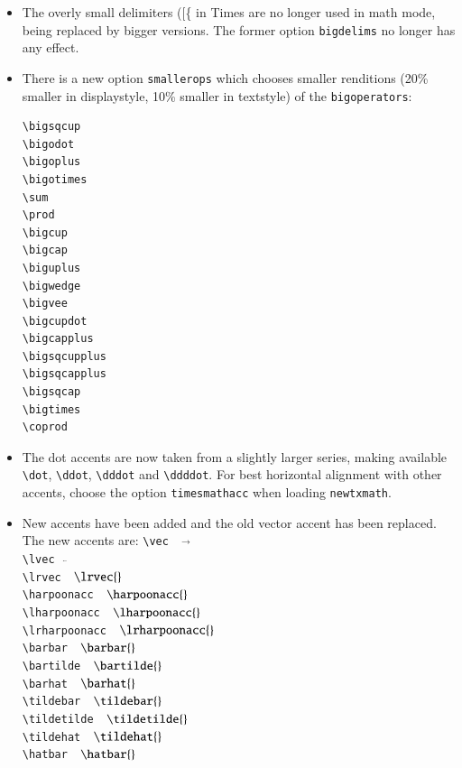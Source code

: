\documentclass[11pt]{article}
\theoremstyle{oldplain}
\theoremstyle{plain}
\begin{document}
\begin{itemize}
\begin{center}
\begin{tabular}{@{} llll @{}}
$\smallvarointclockwise$  & \verb|$\smallvarointclockwise$|& $\varointclockwise$, $\displaystyle{\varointclockwise}$& \verb|$\varointclockwise$|\\ 
$\smallointctrclockwise$  & \verb|$\smallointctrclockwise$|& $\ointctrclockwise$, $\displaystyle{\ointctrclockwise}$& \verb|$\ointctrclockwise$|\\ 
    \bottomrule
  \end{tabular}
\end{center}
\item  The overly small delimiters ([\{ in Times are no longer used in math mode, being replaced by bigger versions. The former option {\tt bigdelims} no longer has any effect.
\item There is a new option {\tt smallerops} which chooses smaller renditions (20\% smaller in displaystyle, 10\% smaller in textstyle) of the {\tt bigoperators}:
\begin{verbatim}
\bigsqcup
\bigodot
\bigoplus
\bigotimes
\sum
\prod
\bigcup
\bigcap
\biguplus
\bigwedge
\bigvee
\bigcupdot
\bigcapplus
\bigsqcupplus
\bigsqcapplus
\bigsqcap
\bigtimes
\coprod
\end{verbatim}
\item The dot accents are now taken from a slightly larger series, making available \verb|\dot|, \verb|\ddot|, \verb|\dddot| and \verb|\ddddot|. For best horizontal alignment with other accents, choose the option {\tt timesmathacc} when loading {\tt newtxmath}.
\item New accents have been added and the old vector accent has been replaced. The new accents are:
\verb|\vec|$\quad\vec{}$\\
\verb|\lvec|$\quad\lvec{}$\\
\verb|\lrvec|$\quad\lrvec{}$\\
\verb|\harpoonacc|$\quad\harpoonacc{}$\\
\verb|\lharpoonacc|$\quad\lharpoonacc{}$\\
\verb|\lrharpoonacc|$\quad\lrharpoonacc{}$\\
\verb|\barbar|$\quad\barbar{}$\\
\verb|\bartilde|$\quad\bartilde{}$\\
\verb|\barhat|$\quad\barhat{}$\\
\verb|\tildebar|$\quad\tildebar{}$\\
\verb|\tildetilde|$\quad\tildetilde{}$\\
\verb|\tildehat|$\quad\tildehat{}$\\
\verb|\hatbar|$\quad\hatbar{}$\\

\end{itemize}
\end{document}
